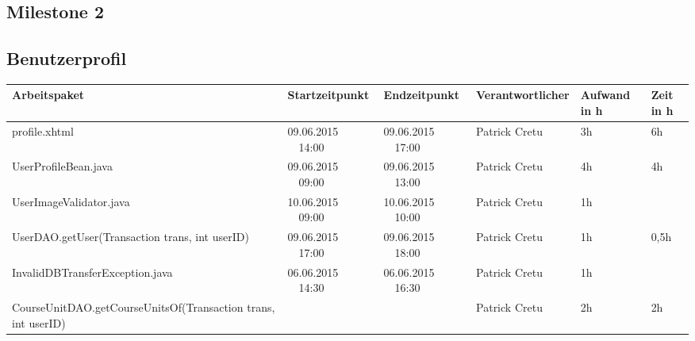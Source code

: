 \begin{landscape}
	\section{Milestone 2}
	
	\subsection{Benutzerprofil}
\begin{tabular}{|p{10.3cm}|p{3.2cm}|p{3.2cm}|p{3.5cm}|p{1.7cm}|p{1.5cm}|}
	\hline  \textbf{Arbeitspaket} & \textbf{Startzeitpunkt} & \textbf{Endzeitpunkt} & \textbf{Verantwortlicher}  & \textbf{Aufwand in h} & \textbf{Zeit in h}\\ 
		\hline   profile.xhtml                                         & 09.06.2015 \ \ 14:00        & 09.06.2015 \ \ 17:00        & Patrick Cretu  &  3h      & 6h\\ 
		\hline   UserProfileBean.java                                  & 09.06.2015 \ \ 09:00        & 09.06.2015 \ \ 13:00        & Patrick Cretu  &  4h      & 4h \\ 
		\hline   UserImageValidator.java                               & 10.06.2015 \ \ 09:00        & 10.06.2015 \ \ 10:00        & Patrick Cretu  &  1h      &    \\ 
		\hline   UserDAO.getUser(Transaction trans, int userID)        & 09.06.2015 \ \ 17:00        & 09.06.2015 \ \ 18:00        & Patrick Cretu  &  1h      & 0,5h\\  
		\hline   InvalidDBTransferException.java                       & 06.06.2015  \ \ 14:30       & 06.06.2015 \ \ 16:30        & Patrick Cretu  &  1h      &\\
		\hline   CourseUnitDAO.getCourseUnitsOf(Transaction trans, int userID)  &         &     & Patrick Cretu & 2h& 2h\\ 
		\hline 
	\end{tabular} \ \\
	\ \\
	

\end{landscape}
